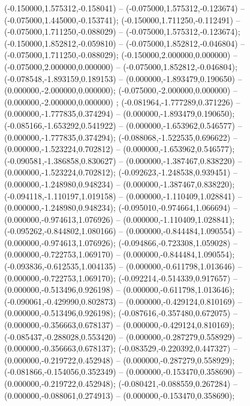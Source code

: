  (-0.150000,1.575312,-0.158041) -- (-0.075000,1.575312,-0.123674) -- (-0.075000,1.445000,-0.153741);
 (-0.150000,1.711250,-0.112491) -- (-0.075000,1.711250,-0.088029) -- (-0.075000,1.575312,-0.123674);
 (-0.150000,1.852812,-0.059810) -- (-0.075000,1.852812,-0.046804) -- (-0.075000,1.711250,-0.088029);
 (-0.150000,2.000000,0.000000) -- (-0.075000,2.000000,0.000000) -- (-0.075000,1.852812,-0.046804);
 (-0.078548,-1.893159,0.189153) -- (0.000000,-1.893479,0.190650) -- (0.000000,-2.000000,0.000000);
 (-0.075000,-2.000000,0.000000) -- (0.000000,-2.000000,0.000000) ;
 (-0.081964,-1.777289,0.371226) -- (0.000000,-1.777835,0.374294) -- (0.000000,-1.893479,0.190650);
 (-0.085166,-1.653292,0.541922) -- (0.000000,-1.653962,0.546577) -- (0.000000,-1.777835,0.374294);
 (-0.088068,-1.522535,0.696622) -- (0.000000,-1.523224,0.702812) -- (0.000000,-1.653962,0.546577);
 (-0.090581,-1.386858,0.830627) -- (0.000000,-1.387467,0.838220) -- (0.000000,-1.523224,0.702812);
 (-0.092623,-1.248538,0.939451) -- (0.000000,-1.248980,0.948234) -- (0.000000,-1.387467,0.838220);
 (-0.094118,-1.110197,1.019158) -- (0.000000,-1.110409,1.028841) -- (0.000000,-1.248980,0.948234);
 (-0.095010,-0.974664,1.066694) -- (0.000000,-0.974613,1.076926) -- (0.000000,-1.110409,1.028841);
 (-0.095262,-0.844802,1.080166) -- (0.000000,-0.844484,1.090554) -- (0.000000,-0.974613,1.076926);
 (-0.094866,-0.723308,1.059028) -- (0.000000,-0.722753,1.069170) -- (0.000000,-0.844484,1.090554);
 (-0.093836,-0.612535,1.004135) -- (0.000000,-0.611798,1.013646) -- (0.000000,-0.722753,1.069170);
 (-0.092214,-0.514339,0.917657) -- (0.000000,-0.513496,0.926198) -- (0.000000,-0.611798,1.013646);
 (-0.090061,-0.429990,0.802873) -- (0.000000,-0.429124,0.810169) -- (0.000000,-0.513496,0.926198);
 (-0.087616,-0.357480,0.672075) -- (0.000000,-0.356663,0.678137) -- (0.000000,-0.429124,0.810169);
 (-0.085437,-0.288028,0.553420) -- (0.000000,-0.287279,0.558929) -- (0.000000,-0.356663,0.678137);
 (-0.083529,-0.220392,0.447327) -- (0.000000,-0.219722,0.452948) -- (0.000000,-0.287279,0.558929);
 (-0.081866,-0.154056,0.352349) -- (0.000000,-0.153470,0.358690) -- (0.000000,-0.219722,0.452948);
 (-0.080421,-0.088559,0.267284) -- (0.000000,-0.088061,0.274913) -- (0.000000,-0.153470,0.358690);
